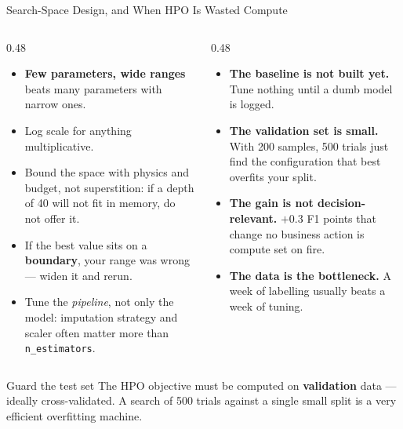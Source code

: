 
\begin{frame}{Search-Space Design, and When HPO Is Wasted Compute}

    \begin{columns}[T]
        \begin{column}{0.48\textwidth}
            \begin{tcolorbox}[colback=green!5, colframe=green!50!black, title=\scriptsize Designing the space]
                \scriptsize
                \begin{itemize}
                    \item \textbf{Few parameters, wide ranges} beats many parameters with narrow ones.
                    \item Log scale for anything multiplicative.
                    \item Bound the space with physics and budget, not superstition: if a depth of 40 will not
                          fit in memory, do not offer it.
                    \item If the best value sits on a \textbf{boundary}, your range was wrong --- widen it and
                          rerun.
                    \item Tune the \emph{pipeline}, not only the model: imputation strategy and scaler often
                          matter more than \texttt{n\_estimators}.
                \end{itemize}
            \end{tcolorbox}
        \end{column}
        \begin{column}{0.48\textwidth}
            \begin{tcolorbox}[colback=red!5, colframe=red!50, title=\scriptsize When to skip HPO entirely]
                \scriptsize
                \begin{itemize}
                    \item \textbf{The baseline is not built yet.} Tune nothing until a dumb model is logged.
                    \item \textbf{The validation set is small.} With 200 samples, 500 trials just find the
                          configuration that best overfits your split.
                    \item \textbf{The gain is not decision-relevant.} $+0.3$ F1 points that change no
                          business action is compute set on fire.
                    \item \textbf{The data is the bottleneck.} A week of labelling usually beats a week of
                          tuning.
                \end{itemize}
            \end{tcolorbox}
        \end{column}
    \end{columns}

    \vspace{0.15em}
    \begin{alertblock}{Guard the test set}
        The HPO objective must be computed on \textbf{validation} data --- ideally cross-validated. A search
        of 500 trials against a single small split is a very efficient overfitting machine.
    \end{alertblock}

\end{frame}
